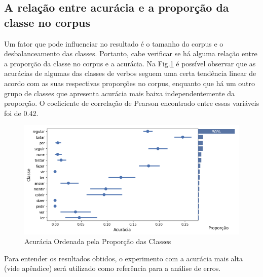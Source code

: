 \subsection{A relação entre acurácia e a proporção da classe no corpus}
\label{sec:prop}
Um fator que pode influenciar no resultado é o tamanho do corpus e o desbalanceamento das classes. Portanto, cabe verificar se há alguma relação entre a proporção da classe no corpus e a acurácia. Na Fig.\ref{fig:kfoldprop} é possível observar que as acurácias de algumas das classes de verbos seguem uma certa tendência linear de acordo com as suas respectivas proporções no corpus, enquanto que há um outro grupo de classes que apresenta acurácia mais baixa independentemente da proporção. O coeficiente de correlação de Pearson encontrado entre essas variáveis foi de 0.42.

\begin{figure}[H]
  \centering
  \includegraphics[width=0.8\linewidth]{img/proporxacc.png}
  \caption{Acurácia Ordenada pela Proporção das Classes}
  \label{fig:kfoldprop}
\end{figure}

Para entender os resultados obtidos, o experimento com a acurácia mais alta (vide apêndice) será utilizado como referência para a análise de erros.

